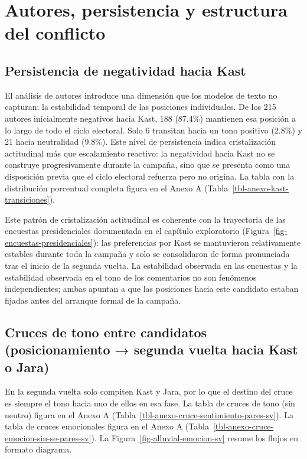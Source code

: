 \documentclass[
  letterpaper,
  numbers=noendperiod,
  fontsize=11pt,
  DIV=12,
  titlepage=false]{scrreprt}
\begin{document}
\section{Autores, persistencia y estructura del
conflicto}\label{autores-persistencia-y-estructura-del-conflicto}

\subsection{Persistencia de negatividad hacia
Kast}\label{persistencia-de-negatividad-hacia-kast}

El análisis de autores introduce una dimensión que los modelos de texto
no capturan: la estabilidad temporal de las posiciones individuales. De
los 215 autores inicialmente negativos hacia Kast, 188 (87.4\%)
mantienen esa posición a lo largo de todo el ciclo electoral. Solo 6
transitan hacia un tono positivo (2.8\%) y 21 hacia neutralidad (9.8\%).
Este nivel de persistencia indica cristalización actitudinal más que
escalamiento reactivo: la negatividad hacia Kast no se construye
progresivamente durante la campaña, sino que se presenta como una
disposición previa que el ciclo electoral refuerza pero no origina. La
tabla con la distribución porcentual completa figura en el Anexo A
(Tabla~\ref{tbl-anexo-kast-transiciones}).

Este patrón de cristalización actitudinal es coherente con la
trayectoria de las encuestas presidenciales documentada en el capítulo
exploratorio (Figura~\ref{fig-encuestas-presidenciales}): las
preferencias por Kast se mantuvieron relativamente estables durante toda
la campaña y solo se consolidaron de forma pronunciada tras el inicio de
la segunda vuelta. La estabilidad observada en las encuestas y la
estabilidad observada en el tono de los comentarios no son fenómenos
independientes; ambas apuntan a que las posiciones hacia este candidato
estaban fijadas antes del arranque formal de la campaña.

\subsection{Cruces de tono entre candidatos (posicionamiento → segunda
vuelta hacia Kast o
Jara)}\label{cruces-de-tono-entre-candidatos-posicionamiento-segunda-vuelta-hacia-kast-o-jara}

En la segunda vuelta solo compiten Kast y Jara, por lo que el destino
del cruce es siempre el tono hacia uno de ellos en esa fase. La tabla de
cruces de tono (sin neutro) figura en el Anexo A
(Tabla~\ref{tbl-anexo-cruce-sentimiento-pares-sv}). La tabla de cruces
emocionales figura en el Anexo A
(Tabla~\ref{tbl-anexo-cruce-emocion-sin-se-pares-sv}). La
Figura~\ref{fig-alluvial-emocion-sv} resume los flujos en formato
diagrama.
\end{document}
